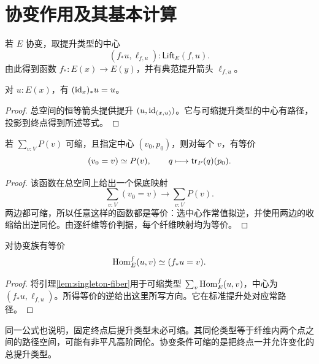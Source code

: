 \section{协变作用及其基本计算}
\begin{definition}[沿箭头的作用]
若 $E$ 协变，取提升类型的中心
\[
(f_*u,\ell_{f,u}):\mathsf{Lift}_E(f,u).
\]
由此得到函数 $f_*:E(x)\to E(y)$，并有典范提升箭头 $\ell_{f,u}$。
\end{definition}
\begin{proposition}[恒等箭头的作用]
对 $u:E(x)$，有 $(\operatorname{id}_x)_*u=u$。
\end{proposition}
\begin{proof}
总空间的恒等箭头提供提升 $(u,\operatorname{id}_{(x,u)})$。它与可缩提升类型的中心有路径，投影到终点得到所述等式。
\end{proof}
\begin{lemma}[可缩总空间的纤维公式]\label{lem:singleton-fiber}
若 $\sum_{v:V}P(v)$ 可缩，且指定中心 $(v_0,p_0)$，则对每个 $v$，有等价
\[
(v_0=v)\simeq P(v),
\qquad q\longmapsto\mathsf{tr}_P(q)(p_0).
\]
\end{lemma}
\begin{proof}
该函数在总空间上给出一个保底映射
\[
\sum_{v:V}(v_0=v)\longrightarrow\sum_{v:V}P(v).
\]
两边都可缩，所以任意这样的函数都是等价：选中心作常值拟逆，并使用两边的收缩给出逆同伦。由逐纤维等价判据，每个纤维映射均为等价。
\end{proof}
\begin{proposition}[依赖箭头的端点公式]\label{prop:dependent-arrow}
对协变族有等价
\[
\operatorname{Hom}_E^f(u,v)\simeq(f_*u=v).
\]
\end{proposition}
\begin{proof}
将引理\ref{lem:singleton-fiber}用于可缩类型
$\sum_v\operatorname{Hom}_E^f(u,v)$，中心为 $(f_*u,\ell_{f,u})$。所得等价的逆给出这里所写方向。它在标准提升处对应常路径。
\end{proof}
\begin{remark}
同一公式也说明，固定终点后提升类型未必可缩。其同伦类型等于纤维内两个点之间的路径空间，可能有非平凡高阶同伦。协变条件可缩的是把终点一并允许变化的总提升类型。
\end{remark}

